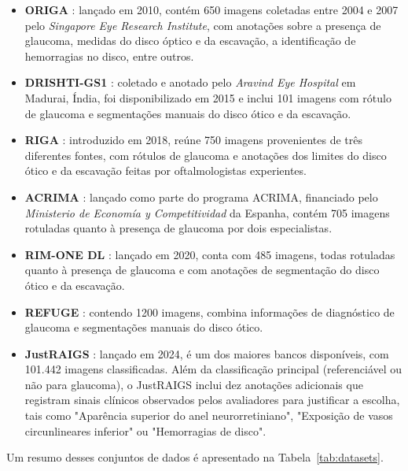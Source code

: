 \documentclass[12pt]{article}
\begin{document}
\begin{itemize}
    \item \textbf{ORIGA} \cite{origa}: lançado em 2010, contém 650 imagens coletadas entre 2004 e 2007 pelo \textit{Singapore Eye Research Institute}, com anotações sobre a presença de glaucoma, medidas do disco óptico e da escavação, a identificação de hemorragias no disco, entre outros.
    \item \textbf{DRISHTI-GS1} \cite{drishti_1} \cite{drishti_2}: coletado e anotado pelo \textit{Aravind Eye Hospital} em Madurai, Índia, foi disponibilizado em 2015 e inclui 101 imagens com rótulo de glaucoma e segmentações manuais do disco ótico e da escavação.
    \item \textbf{RIGA} \cite{riga}: introduzido em 2018, reúne 750 imagens provenientes de três diferentes fontes, com rótulos de glaucoma e anotações dos limites do disco ótico e da escavação feitas por oftalmologistas experientes.
    \item \textbf{ACRIMA} \cite{diaz-pinto2019cnns}: lançado como parte do programa ACRIMA, financiado pelo \textit{Ministerio de Economía y Competitividad} da Espanha, contém 705 imagens rotuladas quanto à presença de glaucoma por dois especialistas.
    \item \textbf{RIM-ONE DL} \cite{rim-one-dl}: lançado em 2020, conta com 485 imagens, todas rotuladas quanto à presença de glaucoma e com anotações de segmentação do disco ótico e da escavação.
    \item \textbf{REFUGE} \cite{refuge}: contendo 1200 imagens, combina informações de diagnóstico de glaucoma e segmentações manuais do disco ótico.
    \item \textbf{JustRAIGS} \cite{justraigs}: lançado em 2024, é um dos maiores bancos disponíveis, com 101.442 imagens classificadas. Além da classificação principal (referenciável ou não para glaucoma), o JustRAIGS inclui dez anotações adicionais que registram sinais clínicos observados pelos avaliadores para justificar a escolha, tais como "Aparência superior do anel neurorretiniano", "Exposição de vasos circunlineares inferior" ou "Hemorragias de disco".
\end{itemize}

Um resumo desses conjuntos de dados é apresentado na Tabela~\ref{tab:datasets}.
\end{document}
